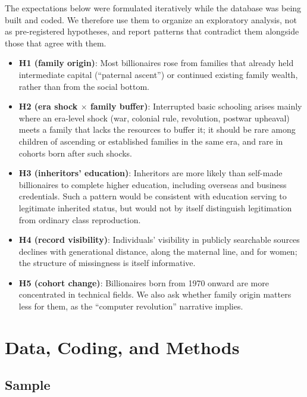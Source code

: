 \documentclass[11pt,a4paper]{article}
\begin{document}
The expectations below were formulated iteratively while the database was being built and coded. We therefore use them to organize an exploratory analysis, not as pre-registered hypotheses, and report patterns that contradict them alongside those that agree with them.

\begin{itemize}
\item \textbf{H1 (family origin)}: Most billionaires rose from families that already held intermediate capital (``paternal ascent'') or continued existing family wealth, rather than from the social bottom.
\item \textbf{H2 (era shock $\times$ family buffer)}: Interrupted basic schooling arises mainly where an era-level shock (war, colonial rule, revolution, postwar upheaval) meets a family that lacks the resources to buffer it; it should be rare among children of ascending or established families in the same era, and rare in cohorts born after such shocks.
\item \textbf{H3 (inheritors' education)}: Inheritors are more likely than self-made billionaires to complete higher education, including overseas and business credentials. Such a pattern would be consistent with education serving to legitimate inherited status, but would not by itself distinguish legitimation from ordinary class reproduction.
\item \textbf{H4 (record visibility)}: Individuals' visibility in publicly searchable sources declines with generational distance, along the maternal line, and for women; the structure of missingness is itself informative.
\item \textbf{H5 (cohort change)}: Billionaires born from 1970 onward are more concentrated in technical fields. We also ask whether family origin matters less for them, as the ``computer revolution'' narrative implies.
\end{itemize}

\section{Data, Coding, and Methods}
\label{sec:data}

\subsection{Sample}
\end{document}
